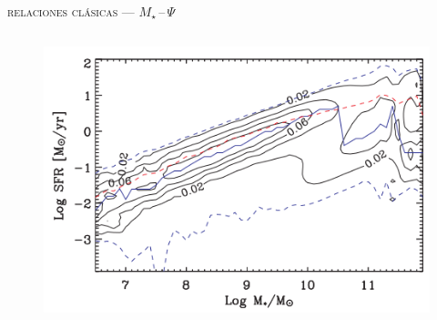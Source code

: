 \documentclass[xcolor=dvipsnames,fleqn,hyperref={colorlinks,citecolor=black,linkcolor=black,urlcolor=black}]{beamer}
\begin{document}
\begin{frame}{\textsc{relaciones clásicas --- $M_\star\,$--$\,\Psi$}}

\begin{columns}
\begin{figure}
\includegraphics[scale=0.9]{img/brinchmann2004-17}
\end{figure}
\end{columns}
\end{frame}
\end{document}
